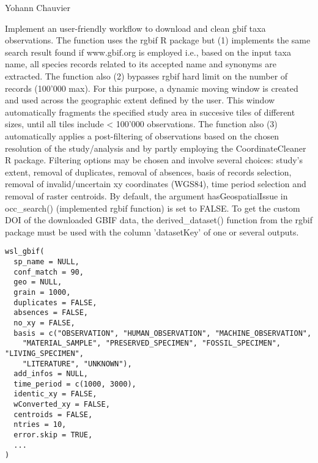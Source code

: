 \documentclass[a4paper]{book}
\begin{document}
%
\begin{Author}\relax
Yohann Chauvier
\end{Author}
%
\begin{Description}\relax
Implement an user-friendly workflow to download and clean gbif taxa observations.
The function uses the rgbif R package but (1) implements the same search result 
found if www.gbif.org is employed i.e., based on the input taxa name, all species
records related to its accepted name and synonyms are extracted. The function
also (2) bypasses rgbif hard limit on the number of records (100'000 max).
For this purpose, a dynamic moving window is created and used across the geographic
extent defined by the user. This window automatically fragments the specified
study area in succesive tiles of different sizes, until all tiles include < 100'000
observations. The function also (3) automatically applies a post-filtering of
observations based on the chosen resolution of the study/analysis and by partly
employing the CoordinateCleaner R package. Filtering options may be chosen and
involve several choices: study's extent, removal of duplicates, removal of absences,
basis of records selection, removal of invalid/uncertain xy coordinates (WGS84), time
period selection and removal of raster centroids. By default, the argument
hasGeospatialIssue in occ\_search() (implemented rgbif function) is set to FALSE.
To get the custom DOI of the downloaded GBIF data, the derived\_dataset() function
from the rgbif package must be used with the column 'datasetKey' of one or several
outputs.
\end{Description}
%
\begin{Usage}
\begin{verbatim}
wsl_gbif(
  sp_name = NULL,
  conf_match = 90,
  geo = NULL,
  grain = 1000,
  duplicates = FALSE,
  absences = FALSE,
  no_xy = FALSE,
  basis = c("OBSERVATION", "HUMAN_OBSERVATION", "MACHINE_OBSERVATION",
    "MATERIAL_SAMPLE", "PRESERVED_SPECIMEN", "FOSSIL_SPECIMEN", "LIVING_SPECIMEN",
    "LITERATURE", "UNKNOWN"),
  add_infos = NULL,
  time_period = c(1000, 3000),
  identic_xy = FALSE,
  wConverted_xy = FALSE,
  centroids = FALSE,
  ntries = 10,
  error.skip = TRUE,
  ...
)
\end{verbatim}
\end{Usage}
%
\end{document}
